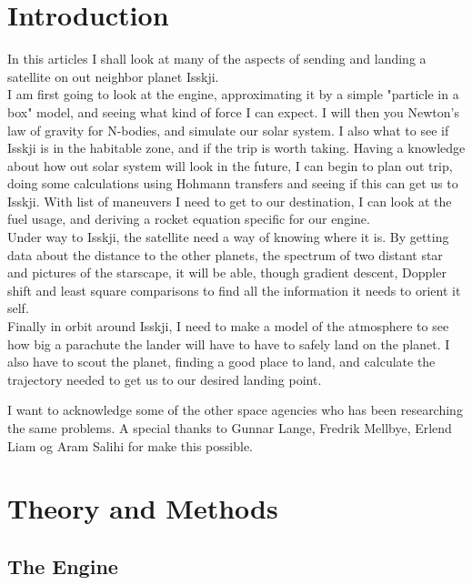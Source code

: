 \documentclass[a4paper, 10pt]{article}
\begin{document}
\tableofcontents

\section{Introduction}

In this articles I shall look at many of the aspects of sending and landing a satellite on out neighbor planet Isskji. \\

I am first going to look at the engine, approximating it by a simple "particle in a box" model, and seeing what kind of force I can expect. I will then you Newton's law of gravity for N-bodies, and simulate our solar system. I also what to see if Isskji is in the habitable zone, and if the trip is worth taking. Having a knowledge about how out solar system will look in the future, I can begin to plan out trip, doing some calculations using Hohmann transfers and seeing if this can get us to Isskji. With list of maneuvers I need to get to our destination, I can look at the fuel usage, and deriving a rocket equation specific for our engine. \\

Under way to Isskji, the satellite need a way of knowing where it is. By getting data about the distance to the other planets, the spectrum of two distant star and pictures of the starscape, it will be able, though gradient descent, Doppler shift and least square comparisons to find all the information it needs to orient it self.\\

Finally in orbit around Isskji, I need to make a model of the atmosphere to see how big a parachute the lander will have to have to safely land on the planet. I also have to scout the planet, finding a good place to land, and calculate the trajectory needed to get us to our desired landing point.

I want to acknowledge some of the other space agencies who has been researching the same problems. A special thanks to Gunnar Lange, Fredrik Mellbye, Erlend Liam og Aram Salihi for make this possible.

\section{Theory and Methods}

\subsection{The Engine}
\end{document}
